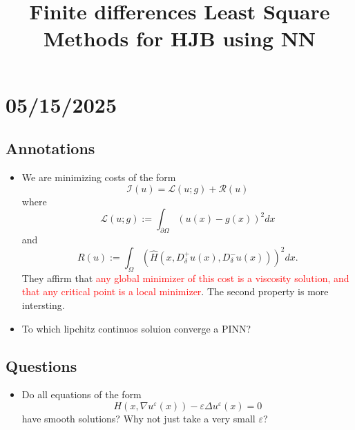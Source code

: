 \documentclass[12pt]{article}
\date{}
\begin{document}
	\title{Finite differences Least Square Methods for HJB using NN} %
	\maketitle
	\section*{05/15/2025}

	\subsection*{Annotations}
	\begin{itemize}
		\item We are minimizing costs of the form $${\mathcal{I}}(u)={\mathcal{L}}(u;g)+{\mathcal{R}}(u)$$ where $$\mathcal{L}(u;g):=\int_{\partial\Omega}\left(u(x)-g(x)\right)^{2}d x$$ and $$R(u):=\int_{\Omega}\left({\widehat{H}}(x,D_{\delta}^{+}u(x),D_{\delta}^{-}u(x))\right)^{2}d x.$$
		They affirm that \textcolor{red}{any global minimizer of this cost is a viscosity solution, and that any critical point is a local minimizer}. The second property is more intersting.
		\item To which lipchitz continuos soluion converge a PINN? 
	\end{itemize}
	\subsection{Questions}
	\begin{itemize}
		\item Do all equations of the form $$H(x,\nabla u^{\varepsilon}(x))-\varepsilon\Delta u^{\varepsilon}(x)=0$$ have smooth solutions? Why not just take a very small $\varepsilon$?
	\end{itemize}
\end{document}
